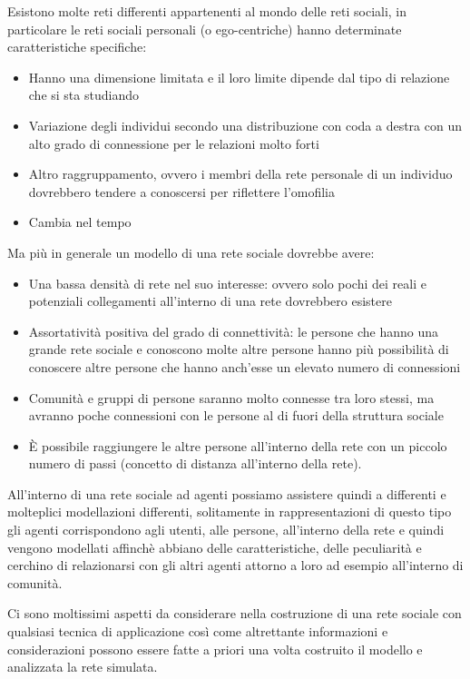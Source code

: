 \documentclass[11pt]{article}
\begin{document}
Esistono molte reti differenti appartenenti al mondo delle reti sociali, in particolare le reti sociali personali (o ego-centriche) hanno determinate caratteristiche specifiche:
\begin{itemize}
    \item Hanno una dimensione limitata e il loro limite dipende dal tipo di relazione che si sta studiando
    \item Variazione degli individui secondo una distribuzione con coda a destra con un alto grado di connessione per le relazioni molto forti
    \item Altro raggruppamento, ovvero i membri della rete personale di un individuo dovrebbero tendere a conoscersi per riflettere l'omofilia
    \item Cambia nel tempo
\end{itemize}

Ma più in generale un modello di una rete sociale dovrebbe avere:
\begin{itemize}
    \item Una bassa densità di rete nel suo interesse: ovvero solo pochi dei reali e potenziali collegamenti all'interno di una rete dovrebbero esistere
    \item Assortatività positiva del grado di connettività: le persone che hanno una grande rete sociale e conoscono molte altre persone hanno più possibilità di conoscere altre persone che hanno anch'esse un elevato numero di connessioni
    \item Comunità e gruppi di persone saranno molto connesse tra loro stessi, ma avranno poche connessioni con le persone al di fuori della struttura sociale 
    \item È possibile raggiungere le altre persone all'interno della rete con un piccolo numero di passi (concetto di distanza all'interno della rete).
\end{itemize}

All'interno di una rete sociale ad agenti possiamo assistere quindi a differenti e molteplici modellazioni differenti, solitamente in rappresentazioni di questo tipo gli agenti corrispondono agli utenti, alle persone, all'interno della rete e quindi vengono modellati affinchè abbiano delle caratteristiche, delle peculiarità e cerchino di relazionarsi con gli altri agenti attorno a loro ad esempio all'interno di comunità.

Ci sono moltissimi aspetti da considerare nella costruzione di una rete sociale con qualsiasi tecnica di applicazione così come altrettante informazioni e considerazioni possono essere fatte a priori una volta costruito il modello e analizzata la rete simulata.
\end{document}
